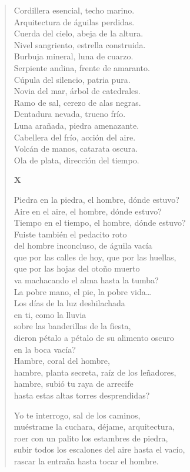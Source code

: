 \documentclass[12pt]{article}
\begin{document}
\begin{verse}
Cordillera esencial, techo marino.\\
Arquitectura de águilas perdidas.\\
Cuerda del cielo, abeja de la altura.\\
Nivel sangriento, estrella construida.\\
Burbuja mineral, luna de cuarzo.\\
Serpiente andina, frente de amaranto.\\
Cúpula del silencio, patria pura.\\
Novia del mar, árbol de catedrales.\\
Ramo de sal, cerezo de alas negras.\\
Dentadura nevada, trueno frío.\\
Luna arañada, piedra amenazante.\\
Cabellera del frío, acción del aire.\\
Volcán de manos, catarata oscura.\\
Ola de plata, dirección del tiempo.  

{\bfseries\scshape {X}}

Piedra en la piedra, el hombre, dónde estuvo?\\
Aire en el aire, el hombre, dónde estuvo?\\
Tiempo en el tiempo, el hombre, dónde estuvo?\\
Fuiste también el pedacito roto\\
del hombre inconcluso, de águila vacía\\
que por las calles de hoy, que por las huellas,\\
que por las hojas del otoño muerto\\
va machacando el alma hasta la tumba?\\
La pobre mano, el pie, la pobre vida\ldots{}\\
Los días de la luz deshilachada\\
en ti, como la lluvia\\
sobre las banderillas de la fiesta,\\
dieron pétalo a pétalo de su alimento oscuro\\
en la boca vacía?\\
Hambre, coral del hombre,\\
hambre, planta secreta, raíz de los leñadores,\\
hambre, subió tu raya de arrecife\\
hasta estas altas torres desprendidas?  

Yo te interrogo, sal de los caminos,\\
muéstrame la cuchara, déjame, arquitectura,\\
roer con un palito los estambres de piedra,\\
subir todos los escalones del aire hasta el vacío,\\
rascar la entraña hasta tocar el hombre.  


\end{verse}
\end{document}

